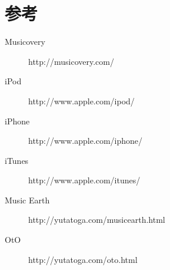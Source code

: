\documentclass{jsarticle}
\begin{document}
\section{参考}
\begin{description}
\item[Musicovery]
http://musicovery.com/
\item[iPod]
http://www.apple.com/ipod/
\item[iPhone]
http://www.apple.com/iphone/
\item[iTunes]
http://www.apple.com/itunes/
\item[Music Earth]
http://yutatoga.com/musicearth.html
\item[OtO]
http://yutatoga.com/oto.html

\end{description}
\end{document}
